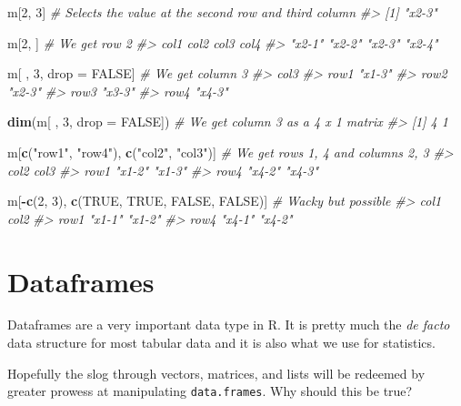\documentclass[
]{book}
\newenvironment{Shaded}{\begin{snugshade}}{\end{snugshade}}
\newcommand{\CommentTok}[1]{\textcolor[rgb]{0.56,0.35,0.01}{\textit{#1}}}
\newcommand{\DataTypeTok}[1]{\textcolor[rgb]{0.13,0.29,0.53}{#1}}
\newcommand{\DecValTok}[1]{\textcolor[rgb]{0.00,0.00,0.81}{#1}}
\newcommand{\KeywordTok}[1]{\textcolor[rgb]{0.13,0.29,0.53}{\textbf{#1}}}
\newcommand{\NormalTok}[1]{#1}
\newcommand{\OperatorTok}[1]{\textcolor[rgb]{0.81,0.36,0.00}{\textbf{#1}}}
\newcommand{\OtherTok}[1]{\textcolor[rgb]{0.56,0.35,0.01}{#1}}
\newcommand{\StringTok}[1]{\textcolor[rgb]{0.31,0.60,0.02}{#1}}
\begin{document}
\begin{Shaded}
\begin{Highlighting}[]
\NormalTok{m[}\DecValTok{2}\NormalTok{, }\DecValTok{3}\NormalTok{] }\CommentTok{# Selects the value at the second row and third column}
\CommentTok{#> [1] "x2-3"}

\NormalTok{m[}\DecValTok{2}\NormalTok{, ] }\CommentTok{# We get row 2}
\CommentTok{#>   col1   col2   col3   col4 }
\CommentTok{#> "x2-1" "x2-2" "x2-3" "x2-4"}

\NormalTok{m[ , }\DecValTok{3}\NormalTok{, drop =}\StringTok{ }\OtherTok{FALSE}\NormalTok{] }\CommentTok{# We get column 3}
\CommentTok{#>      col3  }
\CommentTok{#> row1 "x1-3"}
\CommentTok{#> row2 "x2-3"}
\CommentTok{#> row3 "x3-3"}
\CommentTok{#> row4 "x4-3"}

\KeywordTok{dim}\NormalTok{(m[ , }\DecValTok{3}\NormalTok{, }\DataTypeTok{drop =} \OtherTok{FALSE}\NormalTok{]) }\CommentTok{# We get column 3 as a 4 x 1 matrix}
\CommentTok{#> [1] 4 1}

\NormalTok{m[}\KeywordTok{c}\NormalTok{(}\StringTok{"row1"}\NormalTok{, }\StringTok{"row4"}\NormalTok{), }\KeywordTok{c}\NormalTok{(}\StringTok{"col2"}\NormalTok{, }\StringTok{"col3"}\NormalTok{)] }\CommentTok{# We get rows 1, 4 and columns 2, 3}
\CommentTok{#>      col2   col3  }
\CommentTok{#> row1 "x1-2" "x1-3"}
\CommentTok{#> row4 "x4-2" "x4-3"}

\NormalTok{m[}\OperatorTok{-}\KeywordTok{c}\NormalTok{(}\DecValTok{2}\NormalTok{, }\DecValTok{3}\NormalTok{), }\KeywordTok{c}\NormalTok{(}\OtherTok{TRUE}\NormalTok{, }\OtherTok{TRUE}\NormalTok{, }\OtherTok{FALSE}\NormalTok{, }\OtherTok{FALSE}\NormalTok{)] }\CommentTok{# Wacky but possible}
\CommentTok{#>      col1   col2  }
\CommentTok{#> row1 "x1-1" "x1-2"}
\CommentTok{#> row4 "x4-1" "x4-2"}
\end{Highlighting}
\end{Shaded}

\hypertarget{dataframes}{%
\section{Dataframes}\label{dataframes}}

Dataframes are a very important data type in R. It is pretty much the \emph{de facto} data structure for most tabular data and it is also what we use for statistics.

Hopefully the slog through vectors, matrices, and lists will be redeemed by greater prowess at manipulating \texttt{data.frames}. Why should this be true?
\end{document}

